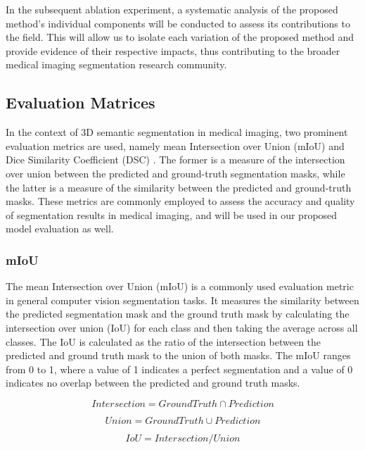 \documentclass{article}
\begin{document}
In the subsequent ablation experiment, a systematic analysis of the proposed method's individual components will be conducted to assess its contributions to the field. This will allow us to isolate each variation of the proposed method and provide evidence of their respective impacts, thus contributing to the broader medical imaging segmentation research community.

\subsection{Evaluation Matrices}

In the context of 3D semantic segmentation in medical imaging, two prominent evaluation metrics are used, namely mean Intersection over Union (mIoU) \cite{34} and Dice Similarity Coefficient (DSC) \cite{35}. The former is a measure of the intersection over union between the predicted and ground-truth segmentation masks, while the latter is a measure of the similarity between the predicted and ground-truth masks. These metrics are commonly employed to assess the accuracy and quality of segmentation results in medical imaging, and will be used in our proposed model evaluation as well.

\subsubsection{mIoU}

The mean Intersection over Union (mIoU) is a commonly used evaluation metric in general computer vision segmentation tasks. It measures the similarity between the predicted segmentation mask and the ground truth mask by calculating the intersection over union (IoU) for each class and then taking the average across all classes. The IoU is calculated as the ratio of the intersection between the predicted and ground truth mask to the union of both masks. The mIoU ranges from 0 to 1, where a value of 1 indicates a perfect segmentation and a value of 0 indicates no overlap between the predicted and ground truth masks.

\begin{equation}
  Intersection = GroundTruth \cap Prediction
  \label{eq:11}
\end{equation}

\begin{equation}
  Union = GroundTruth \cup Prediction
  \label{eq:12}
\end{equation}

\begin{equation}
  IoU = Intersection / Union
  \label{eq:13}
\end{equation}
\end{document}
